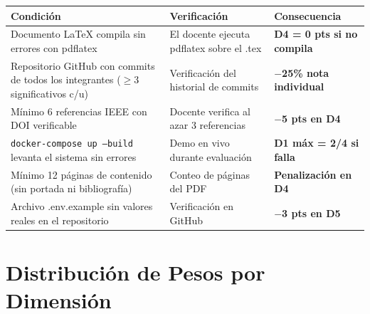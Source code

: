 \documentclass[11pt,a4paper,landscape]{article}
\begin{document}
	\begin{center}
		\begin{tabular}{|P{10cm}|P{7cm}|P{5.5cm}|}
			\hline
			\color{white}\textbf{Condici\'on} & \color{white}\textbf{Verificaci\'on} & \color{white}\textbf{Consecuencia}\\
			\hline
			Documento LaTeX compila sin errores con pdflatex & El docente ejecuta pdflatex sobre el .tex & {\color{lvl1}\textbf{D4 = 0 pts si no compila}}\\
			\hline
			Repositorio GitHub con commits de todos los integrantes ($\geq$3 significativos c/u) & Verificaci\'on del historial de commits & {\color{lvl1}\textbf{$-$25\% nota individual}}\\
			\hline
			M\'inimo 6 referencias IEEE con DOI verificable & Docente verifica al azar 3 referencias & {\color{lvl1}\textbf{$-$5 pts en D4}}\\
			\hline
			\texttt{docker-compose up --build} levanta el sistema sin errores & Demo en vivo durante evaluaci\'on & {\color{lvl1}\textbf{D1 m\'ax = 2/4 si falla}}\\
			\hline
			M\'inimo 12 p\'aginas de contenido (sin portada ni bibliograf\'ia) & Conteo de p\'aginas del PDF & {\color{lvl1}\textbf{Penalizaci\'on en D4}}\\
			\hline
			Archivo .env.example sin valores reales en el repositorio & Verificaci\'on en GitHub & {\color{lvl1}\textbf{$-$3 pts en D5}}\\
			\hline
		\end{tabular}
	\end{center}
	
	\vspace{4pt}
	
	\section{Distribuci\'on de Pesos por Dimensi\'on}
	
\end{document}
